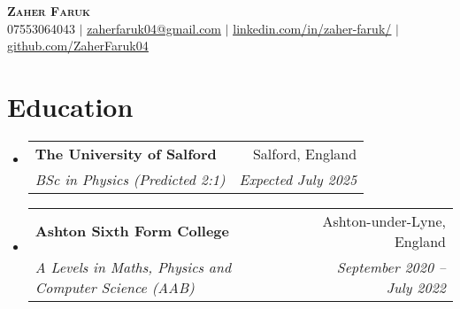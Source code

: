 \documentclass[letterpaper,11pt]{article}
\makeatletter
\newcommand{\resumeSubheading}[4]{
  \vspace{-2pt}\item
    \begin{tabular*}{0.97\textwidth}[t]{l@{\extracolsep{\fill}}r}
      \textbf{#1} & #2 \\
      \textit{\small#3} & \textit{\small #4} \\
    \end{tabular*}\vspace{-7pt}
}
\newcommand{\resumeSubHeadingListStart}{\begin{itemize}[leftmargin=0.15in, label={}]}
\newcommand{\resumeSubHeadingListEnd}{\end{itemize}}
\makeatother
\begin{document}
\begin{center}
    \textbf{\Huge \scshape Zaher Faruk} \\ \vspace{1pt}
    \small 07553064043 $|$ \href{mailto:zaherfaruk@gmail.com}{\underline{zaherfaruk04@gmail.com}} $|$ 
    \href{https://www.linkedin.com/in/zaher-faruk/}{\underline{linkedin.com/in/zaher-faruk/}} $|$
    \href{https://github.com/ZaherFaruk04}{\underline{github.com/ZaherFaruk04}}
\end{center}

\section{Education}
  \resumeSubHeadingListStart
    \resumeSubheading
      {The University of Salford}{Salford, England}
      {BSc in Physics (Predicted 2:1)}{Expected July 2025}
    \resumeSubheading
      {Ashton Sixth Form College}{Ashton-under-Lyne, England }
      {A Levels in Maths, Physics and Computer Science (AAB)}{September 2020 -- July 2022}
  \resumeSubHeadingListEnd
  
\end{document}
